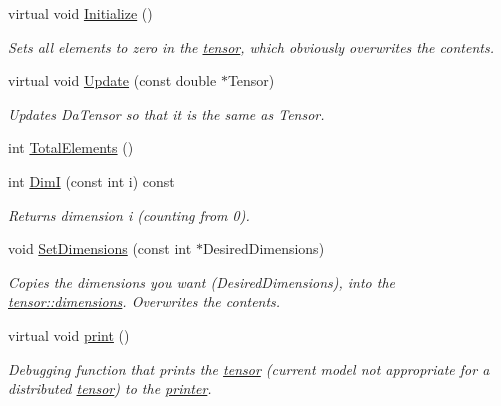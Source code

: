 \begin{DoxyCompactItemize}
virtual void \hyperlink{classJKBuilder_1_1tensor_a98b1050f09da390896f964fb7a892391}{Initialize} ()
\begin{DoxyCompactList}\small\item\em Sets all elements to zero in the \hyperlink{classJKBuilder_1_1tensor}{tensor}, which obviously overwrites the contents. \item\end{DoxyCompactList}\item 
virtual void \hyperlink{classJKBuilder_1_1tensor_a10ffea2bf428adfa3e8319646c44a3c6}{Update} (const double $\ast$Tensor)
\begin{DoxyCompactList}\small\item\em Updates DaTensor so that it is the same as Tensor. \item\end{DoxyCompactList}\item 
int \hyperlink{classJKBuilder_1_1tensor_a537b2f14296e2f0e62f00e1703c5fa08}{TotalElements} ()
\item 
int \hyperlink{classJKBuilder_1_1tensor_a6bdcfca6493bc217b607317dbceb28b2}{DimI} (const int i) const 
\begin{DoxyCompactList}\small\item\em Returns dimension i (counting from 0). \item\end{DoxyCompactList}\item 
void \hyperlink{classJKBuilder_1_1tensor_ace6bcf62c74395ab9e37abc4935f66e0}{SetDimensions} (const int $\ast$DesiredDimensions)
\begin{DoxyCompactList}\small\item\em Copies the dimensions you want (DesiredDimensions), into the \hyperlink{classJKBuilder_1_1tensor_a2ce1e6e0782ddee097f2c4aa2663d3e9}{tensor::dimensions}. Overwrites the contents. \item\end{DoxyCompactList}\item 
virtual void \hyperlink{classJKBuilder_1_1tensor_a388f572c62279f839ee138a9afbdeeb5}{print} ()
\begin{DoxyCompactList}\small\item\em Debugging function that prints the \hyperlink{classJKBuilder_1_1tensor}{tensor} (current model not appropriate for a distributed \hyperlink{classJKBuilder_1_1tensor}{tensor}) to the \hyperlink{classJKBuilder_1_1printer}{printer}. \item\end{DoxyCompactList}\item 

\end{DoxyCompactItemize}
